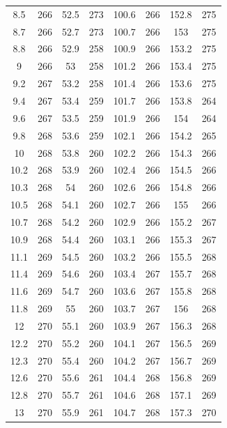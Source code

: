 \documentclass[12pt]{ctexart}
\numberwithin{equation}{section}
\begin{document}
\begin{longtable}{cc|cc|cc|cc}
8.5  &  266  &  52.5  &  273  &  100.6  &  266  &  152.8  &  275  \\
8.7  &  266  &  52.7  &  273  &  100.7  &  266  &  153  &  275  \\
8.8  &  266  &  52.9  &  258  &  100.9  &  266  &  153.2  &  275  \\
9  &  266  &  53  &  258  &  101.2  &  266  &  153.4  &  275  \\
9.2  &  267  &  53.2  &  258  &  101.4  &  266  &  153.6  &  275  \\
9.4  &  267  &  53.4  &  259  &  101.7  &  266  &  153.8  &  264  \\
9.6  &  267  &  53.5  &  259  &  101.9  &  266  &  154  &  264  \\
9.8  &  268  &  53.6  &  259  &  102.1  &  266  &  154.2  &  265  \\
10  &  268  &  53.8  &  260  &  102.2  &  266  &  154.3  &  266  \\
10.2  &  268  &  53.9  &  260  &  102.4  &  266  &  154.5  &  266  \\
10.3  &  268  &  54  &  260  &  102.6  &  266  &  154.8  &  266  \\
10.5  &  268  &  54.1  &  260  &  102.7  &  266  &  155  &  266  \\
10.7  &  268  &  54.2  &  260  &  102.9  &  266  &  155.2  &  267  \\
10.9  &  268  &  54.4  &  260  &  103.1  &  266  &  155.3  &  267  \\
11.1  &  269  &  54.5  &  260  &  103.2  &  266  &  155.5  &  268  \\
11.4  &  269  &  54.6  &  260  &  103.4  &  267  &  155.7  &  268  \\
11.6  &  269  &  54.7  &  260  &  103.6  &  267  &  155.8  &  268  \\
11.8  &  269  &  55  &  260  &  103.7  &  267  &  156  &  268  \\
12  &  270  &  55.1  &  260  &  103.9  &  267  &  156.3  &  268  \\
12.2  &  270  &  55.2  &  260  &  104.1  &  267  &  156.5  &  269  \\
12.3  &  270  &  55.4  &  260  &  104.2  &  267  &  156.7  &  269  \\
12.6  &  270  &  55.6  &  261  &  104.4  &  268  &  156.8  &  269  \\
12.8  &  270  &  55.7  &  261  &  104.6  &  268  &  157.1  &  269  \\
13  &  270  &  55.9  &  261  &  104.7  &  268  &  157.3  &  270  \\

\end{longtable}
\end{document}
